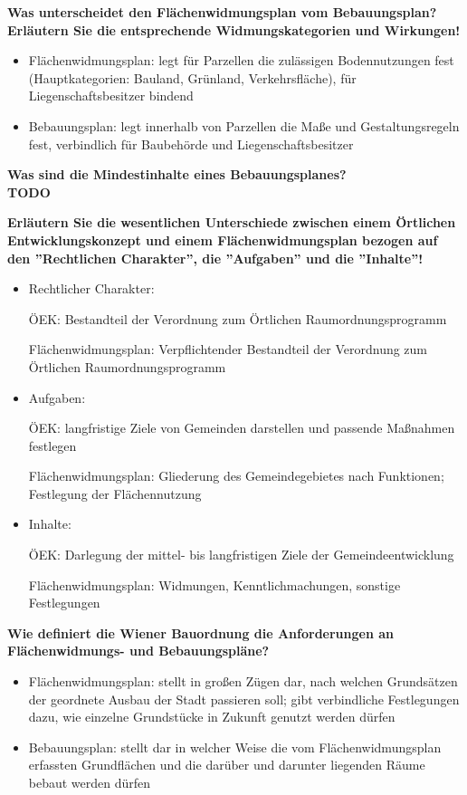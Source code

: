 \documentclass[]{article}
\newenvironment{question}{\vspace{8mm}\noindent\bfseries}{\\}
\begin{document}
\begin{question}
	Was unterscheidet den Flächenwidmungsplan vom Bebauungsplan? Erläutern Sie die entsprechende Widmungskategorien und Wirkungen!
\end{question}
\begin{itemize}
	\item Flächenwidmungsplan: legt für Parzellen die zulässigen Bodennutzungen fest (Hauptkategorien: Bauland, Grünland, Verkehrsfläche), für Liegenschaftsbesitzer bindend
	\item Bebauungsplan: legt innerhalb von Parzellen die Maße und Gestaltungsregeln fest, verbindlich für Baubehörde und Liegenschaftsbesitzer
\end{itemize}

\begin{question}
	Was sind die Mindestinhalte eines Bebauungsplanes?
\end{question}
TODO

\begin{question}
	Erläutern Sie die wesentlichen Unterschiede zwischen einem Örtlichen Entwicklungskonzept und einem Flächenwidmungsplan bezogen auf den ''Rechtlichen Charakter'', die ''Aufgaben'' und die ''Inhalte''!
\end{question}
\begin{itemize}
	\item Rechtlicher Charakter:
	
	ÖEK: Bestandteil der Verordnung zum Örtlichen Raumordnungsprogramm
	
	Flächenwidmungsplan: Verpflichtender Bestandteil der Verordnung zum Örtlichen Raumordnungsprogramm
	
	\item Aufgaben:
	
	ÖEK: langfristige Ziele von Gemeinden darstellen und passende Maßnahmen festlegen
	
	Flächenwidmungsplan: Gliederung des Gemeindegebietes nach Funktionen; Festlegung der Flächennutzung
	
	\item Inhalte:
	
	ÖEK: Darlegung der mittel- bis langfristigen Ziele der Gemeindeentwicklung
	
	Flächenwidmungsplan: Widmungen, Kenntlichmachungen, sonstige Festlegungen
\end{itemize}

\begin{question}
	Wie definiert die Wiener Bauordnung die Anforderungen an Flächenwidmungs- und Bebauungspläne?
\end{question}
\begin{itemize}
	\item Flächenwidmungsplan: stellt in großen Zügen dar, nach welchen Grundsätzen der geordnete Ausbau der Stadt passieren soll; gibt verbindliche Festlegungen dazu, wie einzelne Grundstücke in Zukunft genutzt werden dürfen
	
	\item Bebauungsplan: stellt dar in welcher Weise die vom Flächenwidmungsplan erfassten Grundflächen und die darüber und darunter liegenden Räume bebaut werden dürfen
\end{itemize}
\end{document}
